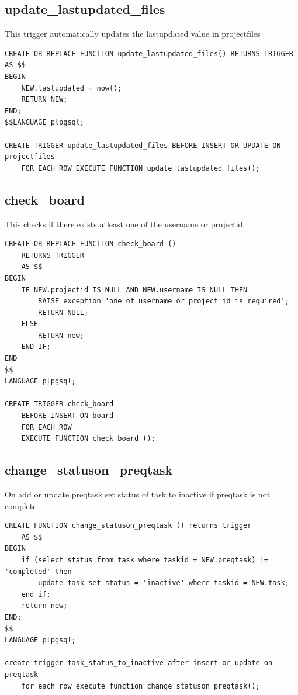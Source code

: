 \documentclass[conference,onecolumn]{IEEEtran}
\begin{document}
\subsection{\textbf{update\_lastupdated\_files}}
This trigger automatically updates the lastupdated value in projectfiles
\begin{verbatim}
CREATE OR REPLACE FUNCTION update_lastupdated_files() RETURNS TRIGGER AS $$
BEGIN
    NEW.lastupdated = now();
    RETURN NEW;
END;
$$LANGUAGE plpgsql;

CREATE TRIGGER update_lastupdated_files BEFORE INSERT OR UPDATE ON projectfiles
    FOR EACH ROW EXECUTE FUNCTION update_lastupdated_files();
\end{verbatim}

\subsection{\textbf{check\_board}}
This checks if there exists atleast one of the username or projectid
\begin{verbatim}
CREATE OR REPLACE FUNCTION check_board ()
    RETURNS TRIGGER
    AS $$
BEGIN
    IF NEW.projectid IS NULL AND NEW.username IS NULL THEN
        RAISE exception 'one of username or project id is required';
        RETURN NULL;
    ELSE
        RETURN new;
    END IF;
END
$$
LANGUAGE plpgsql;

CREATE TRIGGER check_board
    BEFORE INSERT ON board
    FOR EACH ROW
    EXECUTE FUNCTION check_board ();
\end{verbatim}

\subsection{\textbf{change\_statuson\_preqtask}}
On add or update preqtask set status of task to inactive if preqtask is not complete
\begin{verbatim}
CREATE FUNCTION change_statuson_preqtask () returns trigger
    AS $$
BEGIN
    if (select status from task where taskid = NEW.preqtask) != 'completed' then
        update task set status = 'inactive' where taskid = NEW.task;
    end if;
    return new;
END;
$$
LANGUAGE plpgsql;

create trigger task_status_to_inactive after insert or update on preqtask
    for each row execute function change_statuson_preqtask();
\end{verbatim}
\end{document}
